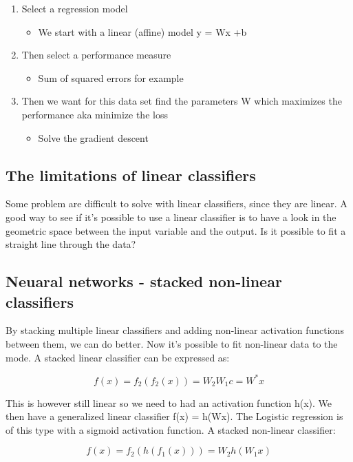 \begin{enumerate}
	\item Select a regression model
	\begin{itemize}
		\item We start with a linear (affine) model y = Wx +b
	\end{itemize}
	\item Then select a performance measure
	\begin{itemize}
		\item Sum of squared errors for example
	\end{itemize}
	\item Then we want for this data set find the parameters W which maximizes the performance aka minimize the loss
	\begin{itemize}
		\item Solve the gradient descent
	\end{itemize}
\end{enumerate}

\subsection*{The limitations of linear classifiers}
Some problem are difficult to solve with linear classifiers, since they are linear. A good way to see if it's possible to use a linear classifier is to have a look in the geometric space between the input variable and the output. Is it possible to fit a straight line through the data?


\subsection*{Neuaral networks - stacked non-linear classifiers}
By stacking multiple linear classifiers and adding non-linear activation functions between them, we can do better. Now it's possible to fit non-linear data to the mode. A stacked linear classifier can be expressed as:

	\begin{equation}
		f(x) = f_2(f_2(x)) = W_2W_1c = W^{*} x
	\end{equation}

This is however still linear so we need to had an activation function h(x). We then have a generalized linear classifier f(x) = h(Wx). The Logistic regression is of this type with a sigmoid activation function. A stacked non-linear classifier:

	\begin{equation}
		f(x) = f_2(h(f_1(x))) = W_2h(W_1x) 	
	\end{equation} 

